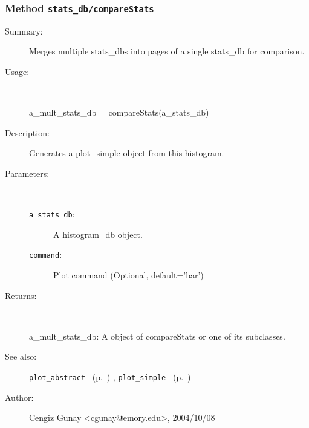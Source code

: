 \subsubsection[Method \texttt{compareStats}]{Method \texttt{stats\_db/compareStats}}%
%
\label{ref_stats_db__compareStats}%
\hypertarget{ref_stats_db__compareStats}{}%
\begin{description}
\item[Summary:]Merges multiple stats\_dbs into pages of a single stats\_db for comparison.
%
\item[Usage:]~%
\begin{lyxcode}%
a\_mult\_stats\_db = compareStats(a\_stats\_db)
%
\end{lyxcode}%
%
\item[Description:]%
Generates a plot\_simple object from this histogram.
\item[Parameters:]~
\begin{description}%
\item[\texttt{a\_stats\_db}:]
 A histogram\_db object.
\item[\texttt{command}:]
 Plot command (Optional, default='bar')
\end{description}%
%
\item[Returns:]~

	a\_mult\_stats\_db: A object of compareStats or one of its subclasses.
%
%
\item[See also:]%
\hyperlink{ref_plot_abstract}{\texttt{plot\_abstract}}%
\ (p.~\pageref{ref_plot_abstract})%
%
, \hyperlink{ref_plot_simple}{\texttt{plot\_simple}}%
\ (p.~\pageref{ref_plot_simple})%
%
%
\item[Author:]%
Cengiz Gunay <cgunay@emory.edu>, 2004/10/08%
\end{description}
\methodline%
